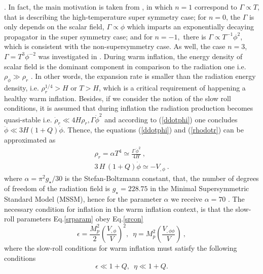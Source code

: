 \documentclass[12pt]{revtex4}
\begin{document}
\cite{Zhang:2009ge,BasteroGil:2011xd,BasteroGil:2012cm,BasteroGil:2012cm1,warm,Visinelli}.
{In fact, the main motivation is taken from \cite{sdel, sdel2,26,BasteroGil:2011xd,BasteroGil:2012cm,BasteroGil:2012cm1,Herrera:2015a2}, in which $n=1$ correspond to $\Gamma\propto T$, that is describing the high-temperature super symmetry case; for $n=0$, the $\Gamma$ is only depends on the scalar field, $\Gamma\propto\phi$ which imparts an exponentially decaying propagator in the super symmetry case; and for $n=-1,$ there is $\Gamma\propto T^{-1}\phi^{2}$, which is consistent with the non-supersymmetry case.  As well, the case $n=3$, $\Gamma=T^3\phi^{-2}$   was investigated in \cite{sdel2}.   }
During warm inflation, the energy density of scalar field  is the dominant component in comparison to the radiation one i.e. $\rho_\phi\gg\rho_r$ {\cite{warm,warm0,warm1,warm2}}. In other words, the expansion rate  is smaller than  the radiation energy density, i.e.    $\rho_r^{1/4}>H$ or $T>H$,  which is a critical requirement of happening a healthy warm inflation.
Besides, if we consider the  notion of the slow roll conditions, it is assumed that during inflation the radiation production becomes quasi-stable i.e. $\dot{\rho
}_r\ll4H\rho_r,\Gamma\dot{\phi}^{2}$
 {\cite{warm,warm0,warm2}} and according to (\ref{ddotphi}) one concludes $\ddot \phi \ll3H(1 + Q)\dot \phi$. Thence, the equations (\ref{ddotphi}) and  (\ref{rhodotr}) can be approximated as
\begin{eqnarray}
\rho_r=\alpha T^4\simeq \frac{\Gamma\,\dot{\phi}^{2}}{4H}~,\label{rhor}\\
3\,H\,(1+Q)\dot{\phi}\simeq -V_{,\phi}~.
\label{phidot}%
\end{eqnarray}
where $\alpha=\pi^2 g_\star / 30$ is the {Stefan-Boltzmann} constant, {that, the number of degrees of freedom of the radiation field  is $g_\star=228.75$ in the Minimal Supersymmetric Standard Model (MSSM), }   {hence for the parameter $\alpha$ we receive $\alpha=70$} .
The necessary condition for inflation in the warm inflation context, is that the slow-roll parameters Eq.\eqref{srparam} obey Eq.\eqref{srcon}
\begin{equation}
\epsilon=\frac{M^2_p}{2}\left(\frac{V_{,\phi}}{V}\right)^2,\,\,\,\eta=M^2_p\left(\frac{V_{,\phi \phi}}{V}\right)~,\label{srparam}
\end{equation}
where the slow-roll conditions for warm inflation must  satisfy the following conditions \cite{warm2,26,Grigorios,R2,R3,R4,R5}
\begin{equation}
\epsilon \ll 1+Q,\,\,\,\eta \ll 1+Q.\label{srcon}
\end{equation}
\end{document}
